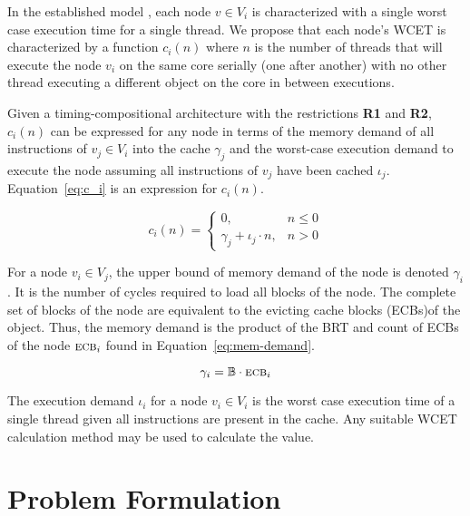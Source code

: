 In the established model \addcite, each node ${v \in V_i}$ is characterized
with a single worst case execution time for a single thread. We
propose that each node's WCET is characterized by a function
${c_i(n)}$ where ${n}$ is the number of threads that will execute the
node ${v_i}$ on the same core serially (one after another) with no
other thread executing a different object on the core in between executions.

Given a timing-compositional architecture with the restrictions \textbf{R1} and \textbf{R2},
${c_i(n)}$ can be expressed for any node in terms of the memory demand of all instructions
of ${v_j \in V_i}$ into the cache ${\gamma_j}$ and the worst-case execution demand
to execute the node assuming all instructions of ${v_j}$ have
been cached ${\iota_j}$. Equation~\ref{eq:c_i} is an expression for
${c_i(n)}$. 
 
\begin{equation}
  \label{eq:c_i}
  c_i(n) = \begin{cases}
    0, & n \le 0 \\
    \gamma_j + \iota_j \cdot n, & n > 0
  \end{cases}
\end{equation}

For a node ${v_i \in V_j}$, the upper bound of memory demand of the node is denoted ${\gamma_i}$. It is the number of cycles required to load all blocks of the node. The complete set of blocks of the node are equivalent to the evicting cache blocks (ECBs) of the object. Thus, the memory demand is the product of the BRT and count of ECBs of the node ${\textsc{ecb}_i}$ found in Equation~\ref{eq:mem-demand}.

\begin{equation}{\label{eq:mem-demand}}
    \gamma_i = \mathbb{B} \cdot \textsc{ecb}_i
\end{equation}

The execution demand ${\iota_i}$ for a node ${v_i \in V_i}$ is the worst case execution time of a single thread given all instructions are present in the cache. Any suitable WCET calculation method {\addcite} may be used to calculate the value.


\section{Problem Formulation}
